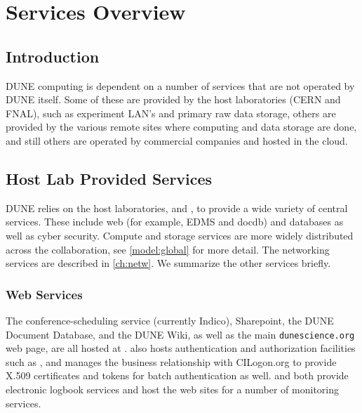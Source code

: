 \documentclass[../main-v1.tex]{subfiles}
\begin{document}
\chapter{Services Overview }
\label{ch:serv}

\section{Introduction}
DUNE computing is dependent on a number of services that are not operated by DUNE itself.
Some of these are provided by the host laboratories (CERN and FNAL), such as experiment LAN's and primary raw data storage,  others are provided by the various remote sites where
computing and data storage are done, and still others are operated by commercial companies and hosted in the cloud.

\section{Host Lab Provided Services}
DUNE relies on the host laboratories,  and , to provide a wide variety of central services.  These include web (for example, EDMS and docdb) and databases as well as cyber security. Compute and storage services are more widely distributed across the collaboration, see \ref{model:global} for more detail.  The networking services are described in \ref{ch:netw}.  We summarize the other services briefly.

\subsection{Web Services}
The conference-scheduling service (currently Indico), Sharepoint, the DUNE Document Database, and the DUNE Wiki, as well as the main {\tt dunescience.org} web page, are all hosted at .  
 also hosts authentication and authorization facilities such as , and manages the business relationship with CILogon.org to provide X.509 certificates and   tokens for batch authentication as well.  
 and  both  provide  electronic logbook services and 
host the web sites for a number of monitoring services. 
\end{document}
